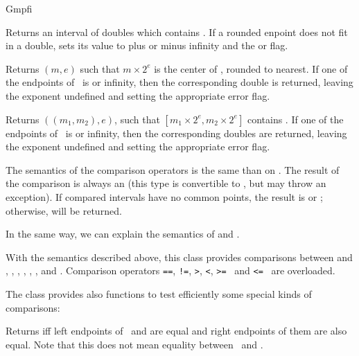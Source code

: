 \begin{ccRefClass} {Gmpfi}

        {Returns an interval of doubles which contains \ccVar. If a
        rounded enpoint does not fit in a double, sets its value to plus
        or minus infinity and the  or  flag.}

        {Returns \((m,e)\) such that \(m \times 2^e\) is the center of
        \ccVar, rounded to nearest. If one of the endpoints of \ccVar~is
         or infinity, then the corresponding double is returned,
        leaving the exponent undefined and setting the appropriate
        error flag.}

        {Returns \(((m_1,m_2),e)\), such that \([m_1 \times 2^e,m_2
        \times 2^e]\) contains \ccVar . If one of the endpoints of
        \ccVar~is  or infinity, then the corresponding doubles
        are returned, leaving the exponent undefined and setting the
        appropriate error flag.}



The semantics of the comparison operators is the same than on
. The result of the comparison is always an
 (this type is convertible to , but may
throw an exception). If compared intervals have no common points, the
result is  or ; otherwise,
 will be returned.

In the same way, we can explain the semantics of
 and .

With the semantics described above, this class provides comparisons between
 and , , , ,
, ,  and . Comparison operators
\verb-==-, \verb-!=-, \verb->-, \verb-<-, \verb->=- \ and \verb-<=- \ are
overloaded.

The class provides also functions to test efficiently some special kinds
of comparisons:

        {Returns  iff left endpoints of \ccVar~and
         are equal and right endpoints of them are also equal. Note
        that this does not mean equality between \ccVar~and .}


\end{ccRefClass}
